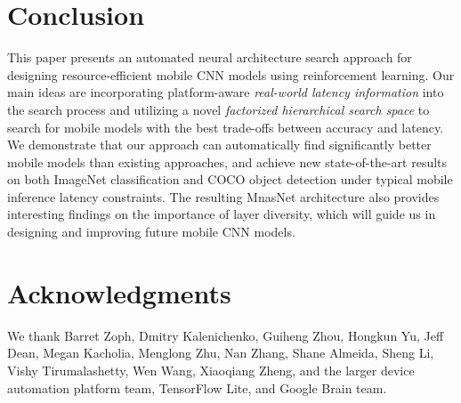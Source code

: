 \documentclass[10pt,twocolumn,letterpaper]{article}
\begin{document}
\section{Conclusion}
\label{sec:conclusion}

This paper presents an automated neural architecture search  approach for designing resource-efficient mobile CNN models using reinforcement learning. Our main ideas are incorporating platform-aware \emph{real-world latency information} into the search process and utilizing a novel \emph{factorized hierarchical search space} to search for mobile models with the best trade-offs between accuracy and latency. We demonstrate that our approach can automatically find significantly better mobile models than existing approaches, and achieve new state-of-the-art results on both ImageNet classification and COCO object detection under typical  mobile inference latency constraints. The resulting MnasNet architecture also provides interesting findings on the importance of layer diversity, which will guide us in designing and improving future mobile CNN models.


\section{Acknowledgments}
\label{sec:ack}
We thank Barret Zoph, Dmitry Kalenichenko, Guiheng Zhou, Hongkun Yu, Jeff Dean, Megan Kacholia, Menglong Zhu, Nan Zhang, Shane Almeida, Sheng Li, Vishy Tirumalashetty, Wen Wang, Xiaoqiang Zheng, and the larger device automation platform team, TensorFlow Lite, and Google Brain team.

 
{\small
	
	
}


%
\end{document}
